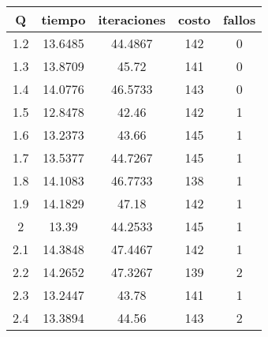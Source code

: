\begin{table}[h!]
\centering
\begin{tabular}{ccccc}
Q & tiempo & iteraciones & costo & fallos \\ 
\hline 
1.2 & 13.6485 & 44.4867 & 142 & 0 \\ 
1.3 & 13.8709 & 45.72 & 141 & 0 \\ 
1.4 & 14.0776 & 46.5733 & 143 & 0 \\ 
1.5 & 12.8478 & 42.46 & 142 & 1 \\ 
1.6 & 13.2373 & 43.66 & 145 & 1 \\ 
1.7 & 13.5377 & 44.7267 & 145 & 1 \\ 
1.8 & 14.1083 & 46.7733 & 138 & 1 \\ 
1.9 & 14.1829 & 47.18 & 142 & 1 \\ 
2 & 13.39 & 44.2533 & 145 & 1 \\ 
2.1 & 14.3848 & 47.4467 & 142 & 1 \\ 
2.2 & 14.2652 & 47.3267 & 139 & 2 \\ 
2.3 & 13.2447 & 43.78 & 141 & 1 \\ 
2.4 & 13.3894 & 44.56 & 143 & 2 \\ 
\hline 
\end{tabular}
\end{table}